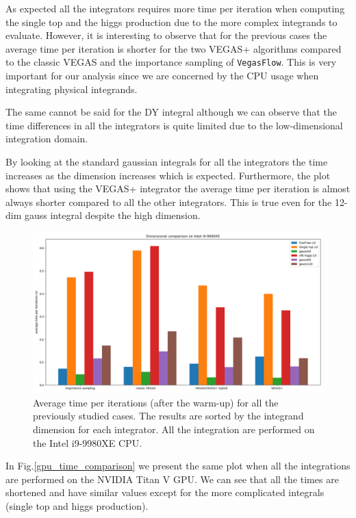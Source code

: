 \documentclass[../main/main.tex]{subfiles}
\begin{document}
As expected all the integrators requires more time per iteration when computing the single top and the higgs production due to the more complex integrands to evaluate. However, it is interesting to observe that for the previous cases the average time per iteration is shorter for the two VEGAS+ algorithms compared to the classic VEGAS and the importance sampling of \texttt{VegasFlow}.
This is very important for our analysis since we are concerned by the CPU usage when integrating physical integrands. 

The same cannot be said for the DY integral although we can observe that the time differences in all the integrators is quite limited due to the low-dimensional integration domain.

By looking at the standard gaussian integrals for all the integrators the time increases as the dimension increases which is expected. Furthermore, the plot shows that using the VEGAS+ integrator the average time per iteration is almost always shorter compared to all the other integrators. This is true even for the 12-dim gauss integral despite the high dimension.


\begin{figure}[h]
	\centering
	\includegraphics[width=\textwidth]{../images/dim_comparison_CPU.png}
	\caption{Average time per iterations (after the warm-up) for all the previously studied cases. The results are sorted by the integrand dimension for each integrator. All the integration are performed on the Intel i9-9980XE CPU. }
	\label{cpu_time_comparison}
\end{figure}

In Fig.\ref{gpu_time_comparison} we present the same plot when all the integrations are performed on the NVIDIA Titan V GPU. We can see that all the times are shortened and have similar values except for the more complicated integrals (single top and higgs production).
\end{document}

